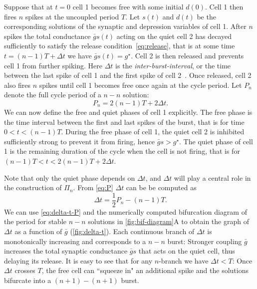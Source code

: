 \documentclass[utf8]{frontiersFPHY} %
\newcommand{\gbar}{\bar g}
\newcommand{\delt}{\Delta t}
\begin{document}
Suppose that at $t=0$ cell 1 becomes free with some initial $d(0)$. 
Cell 1 then fires $n$ spikes at the uncoupled period $T$.
Let $s(t)$ and $d(t)$ be the corresponding solutions of the synaptic and depression variables of cell 1.
After $n$ spikes the total conductance $\gbar s(t)$ acting on the quiet cell 2 has decayed sufficiently to satisfy the release condition~\eqref{eq:release}, that is at some time $t=(n-1)T+\delt$ we have $\gbar s(t)=g^{\star}$.
Cell 2 is then released and prevents cell 1 from further spiking.
Here $\delt$ is the \emph{inter-burst-interval}, or the time between the last spike of cell 1 and the first spike of cell 2~\citep{bose2011}.
Once released, cell 2 also fires $n$ spikes until cell 1 becomes free once again at the cycle period.
Let $P_n$ denote the full cycle period of a $n-n$ solution:
\begin{equation}
 ~\label{eq:P}
  P_n = 2(n-1)T + 2\delt.
\end{equation}
We can now define the free and quiet phases of cell 1 explicitly. The free phase is the time interval between the first and last spikes of the burst, that is for time $0<t<(n-1)T$.
During the free phase of cell 1, the quiet cell 2 is inhibited sufficiently strong to prevent it from firing, hence $\gbar s > g^{\star}$.
The quiet phase of cell 1 is the remaining duration of the cycle when the cell is not firing, that is for $(n-1)T < t < 2(n-1)T + 2\delt$.

Note that only the quiet phase depends on $\delt$, and $\delt$ will play a central role in the construction of $\Pi_{n}$.
From \cref{eq:P} $\delt$ can be be computed as
\begin{equation}
 ~\label{eq:delta-t-P}
  \delt = \frac{1}{2}P_n - (n-1)T.
\end{equation}
\noindent
We can use \cref{eq:delta-t-P} and the numerically computed bifurcation diagram of the period for stable $n-n$ solutions in \cref{fig:bif-diagram}A to obtain the graph of $\delt$ as a function of $\gbar$ (\cref{fig:delta-t}).
Each continuous branch of $\delt$ is monotonically increasing and corresponds to a $n-n$ burst:
Stronger coupling $\gbar$ increases the total synaptic conductance $\gbar s$ that acts on the quiet cell, thus delaying its release.
It is easy to see that for any $n$-branch we have $\delt<T$:
Once $\delt$ crosses $T$, the free cell can ``squeeze in" an additional spike and the solutions bifurcate into a $(n+1)-(n+1)$ burst.
\end{document}
